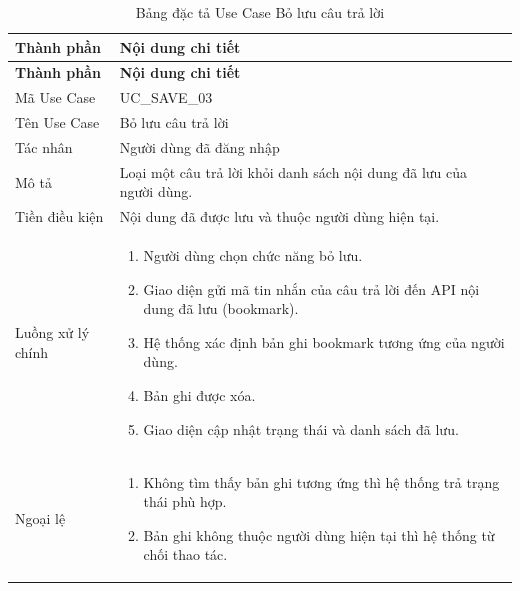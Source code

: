 \documentclass[12pt,a4paper,oneside]{report}
\begin{document}
{
  \begin{longtable}{|L{3.6cm}|L{11.2cm}|}
    \caption{Bảng đặc tả Use Case Bỏ lưu câu trả lời}\label{tab:uc-unsave}                                     \\
    \hline
    \textbf{Thành phần} & \textbf{Nội dung chi tiết}                                                             \\
    \hline
    \endfirsthead
    \hline
    \textbf{Thành phần} & \textbf{Nội dung chi tiết}                                                             \\
    \hline
    \endhead
    Mã Use Case       & UC\_SAVE\_03                                                                           \\
    \hline
    Tên Use Case      & Bỏ lưu câu trả lời                                                                     \\
    \hline
    Tác nhân            & Người dùng đã đăng nhập                                                                \\
    \hline
    Mô tả               & Loại một câu trả lời khỏi danh sách nội dung đã lưu của người dùng.                    \\
    \hline
    Tiền điều kiện      & Nội dung đã được lưu và thuộc người dùng hiện tại.                                     \\
    \hline
    Luồng xử lý chính   & \begin{enumerate}[leftmargin=*,nosep]
                            \item Người dùng chọn chức năng bỏ lưu.
                            \item Giao diện gửi mã tin nhắn của câu trả lời đến API nội dung đã lưu (bookmark).
                            \item Hệ thống xác định bản ghi bookmark tương ứng của người dùng.
                            \item Bản ghi được xóa.
                            \item Giao diện cập nhật trạng thái và danh sách đã lưu.
                          \end{enumerate}     \\
    \hline
    Ngoại lệ            & \begin{enumerate}[leftmargin=*,nosep]
                            \item Không tìm thấy bản ghi tương ứng thì hệ thống trả trạng thái phù hợp.
                            \item Bản ghi không thuộc người dùng hiện tại thì hệ thống từ chối thao tác.

\end{enumerate}
\end{longtable}}
\end{document}
